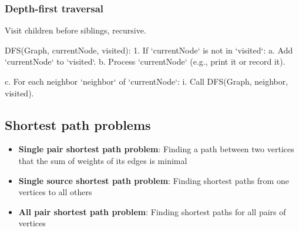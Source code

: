 \documentclass{report}
\begin{document}
\bigbreak \noindent 
\subsubsection{Depth-first traversal}
\bigbreak \noindent 
Visit children before siblings, recursive.
\bigbreak \noindent 
\begin{cppcode}
DFS(Graph, currentNode, visited):
    1. If `currentNode` is not in `visited`:
        a. Add `currentNode` to `visited`.
        b. Process `currentNode` (e.g., print it or record it).

        c. For each neighbor `neighbor` of `currentNode`:
            i. Call DFS(Graph, neighbor, visited).
\end{cppcode}

\bigbreak \noindent 
\subsection{Shortest path problems}
\bigbreak \noindent 
\begin{itemize}
    \item \textbf{Single pair shortest path problem}: Finding a path between two vertices that the sum of weights of its edges is minimal
    \item \textbf{Single source shortest path problem}: Finding shortest paths from one vertices to all others
    \item \textbf{All pair shortest path problem}: Finding shortest paths for all pairs of vertices
\end{itemize}

\pagebreak 
\end{document}

